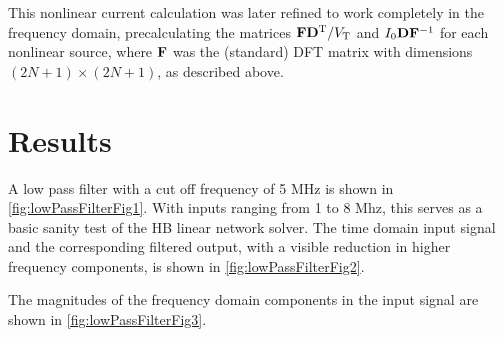 This nonlinear current calculation was later refined to work completely in the frequency domain, precalculating the matrices \( \mathbf{F} \mathbf{D}^{\text{T}}/V_{\textrm{T}} \) and \( I_0 \mathbf{D} \mathbf{F}^{-1} \) for each nonlinear source, where \( \mathbf{F} \) was the (standard) DFT matrix with dimensions \( (2 N + 1 ) \times (2 N + 1 ) \), as described above.

\section{Results}




A low pass filter with a cut off frequency of 5 MHz is shown in
\cref{fig:lowPassFilterFig1}.
With
inputs
ranging from 1 to 8 Mhz, this serves as a basic sanity test of the HB linear network solver.
The time domain input signal and the corresponding filtered output, with a visible reduction in higher frequency components,
is shown in \cref{fig:lowPassFilterFig2}.


The magnitudes of the frequency domain components in the input signal are shown in \cref{fig:lowPassFilterFig3}.



